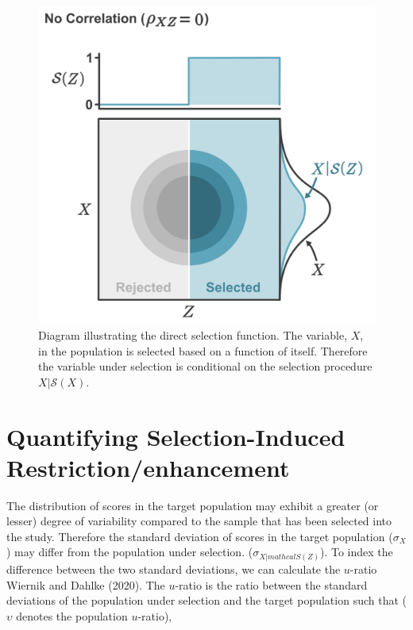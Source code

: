 \documentclass[
  letterpaper,
  DIV=11,
  numbers=noendperiod]{scrreprt}
\begin{document}
\begin{figure}[H]

{\centering \includegraphics{figure/selection_function_indirect_no_corr.png}

}

\caption{\label{fig-indirect-select-diag-no-corr}Diagram illustrating
the direct selection function. The variable, \(X\), in the population is
selected based on a function of itself. Therefore the variable under
selection is conditional on the selection procedure
\(X|\mathcal{S}(X)\).}

\end{figure}

\hypertarget{quantifying-selection-induced-restrictionenhancement}{%
\section{Quantifying Selection-Induced
Restriction/enhancement}\label{quantifying-selection-induced-restrictionenhancement}}

The distribution of scores in the target population may exhibit a
greater (or lesser) degree of variability compared to the sample that
has been selected into the study. Therefore the standard deviation of
scores in the target population (\(\sigma_{X}\)) may differ from the
population under selection. (\(\sigma_{X|mathcal{S}(Z)}\)). To index the
difference between the two standard deviations, we can calculate the
\(u\)-ratio Wiernik and Dahlke (2020). The \(u\)-ratio is the ratio
between the standard deviations of the population under selection and
the target population such that (\(\upsilon\) denotes the population
\(u\)-ratio),
\end{document}
